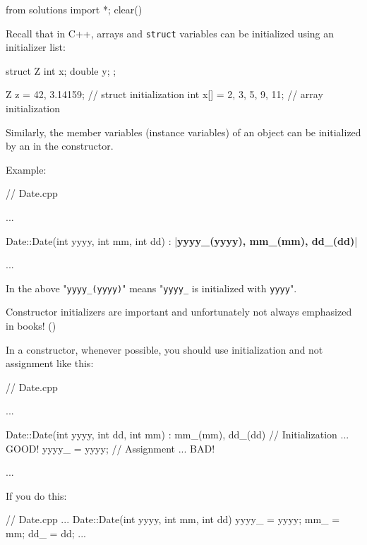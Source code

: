 \begin{python0}
from solutions import *; clear()
\end{python0}

Recall that in C++, arrays and \texttt{struct} variables can be
initialized using an initializer list:

\begin{consolethree}[escapeinside=||]
struct Z
{
    int x;
    double y;
};

Z z = {42, 3.14159}; // struct initialization
int x[] = {2, 3, 5, 9, 11}; // array initialization
\end{consolethree}

Similarly, the member variables (instance variables) of an object can be
initialized by an  in the constructor.

Example:

\begin{consolethree}[escapeinside=||]
// Date.cpp

...

Date::Date(int yyyy, int mm, int dd)
        : |\textbf{yyyy\_(yyyy), mm\_(mm), dd\_(dd)}|
{}

...
\end{consolethree}

In the above "\texttt{yyyy\_(yyyy)}" means "\texttt{yyyy\_} is initialized
with \texttt{yyyy}".

Constructor initializers are important and unfortunately not always
emphasized in books! ()

In a constructor, whenever possible, you should use initialization and
not assignment like this:

\begin{consolethree}[escapeinside=||]
// Date.cpp

...

Date::Date(int yyyy, int dd, int mm)
    : mm_(mm), dd_(dd) // Initialization ... GOOD!
{
    yyyy_ = yyyy;          // Assignment ... BAD!
}

...
\end{consolethree}

 If you do this:

\begin{consolethree}[escapeinside=||]
// Date.cpp
...
Date::Date(int yyyy, int mm, int dd)
{
    yyyy_ = yyyy;
    mm_ = mm;
    dd_ = dd;
}
...
\end{consolethree}

